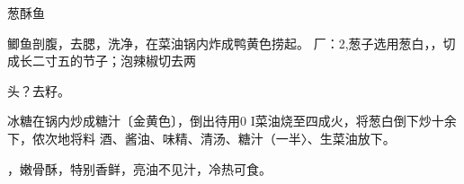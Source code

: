 \begin{recipe}{葱酥鱼}

\ingredients


\cooking

\step 鲫鱼剖腹，去腮，洗净，在菜油锅内炸成鸭黄色捞起。 厂：2,葱子选用葱白，，切成长二寸五的节子；泡辣椒切去两

头？去籽。

\step 冰糖在锅内炒成糖汁〔金黄色〕，倒出待用0 I菜油烧至四成火，将葱白倒下炒十余下，侬次地将料 酒、酱油、味精、清汤、糖汁（一半〉、生菜油放下。

\notes

，嫩骨酥，特别香鲜，亮油不见汁，冷热可食。

\end{recipe}

